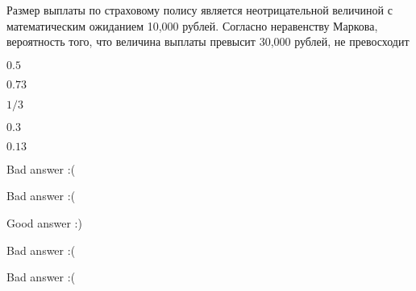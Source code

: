 
\begin{question}
Размер выплаты по страховому полису является неотрицательной величиной с
математическим ожиданием 10,000 рублей. Согласно неравенству Маркова,
вероятность того, что величина выплаты превысит 30,000 рублей, не
превосходит
\begin{answerlist}
  \item \(0.5\)
  \item \(0.73\)
  \item \(1/3\)
  \item \(0.3\)
  \item \(0.13\)
\end{answerlist}
\end{question}

\begin{solution}
\begin{answerlist}
  \item Bad answer :(
  \item Bad answer :(
  \item Good answer :)
  \item Bad answer :(
  \item Bad answer :(
\end{answerlist}
\end{solution}

